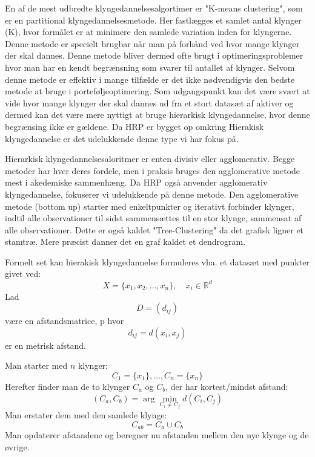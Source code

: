 \documentclass[../main.tex]{subfiles}
\begin{document}
En af de mest udbredte klyngedannelsesalgortimer er "K-means clustering", som er en partitional klyngedannelsesmetode. Her fastlægges et samlet antal klynger (K), hvor formålet er at minimere den samlede variation inden for klyngerne. Denne metode er specielt brugbar når man på forhånd ved hvor mange klynger der skal dannes. Denne metode bliver dermed ofte brugt i optimeringsproblemer hvor man har en kendt begrænsning som svarer til antallet af klynger. Selvom denne metode er effektiv i mange tilfælde er det ikke nødvendigvis den bedste metode at bruge i porteføljeoptimering. Som udgangspunkt kan det være svært at vide hvor mange klynger der skal dannes ud fra et stort datasæt af aktiver og dermed kan det være mere nyttigt at bruge hierarkisk klyngedannelse, hvor denne begrænsing ikke er gældene. Da HRP er bygget op omkring Hierakisk klyngedannelse er det udelukkende denne type vi har fokus på.

Hierarkisk klyngedannelsesaloritmer er enten divisiv eller agglomerativ. Begge metoder har hver deres fordele, men i praksis bruges den agglomerative metode mest i akedemiske sammenhæng. Da HRP også anvender agglomerativ klyngedannelse, fokuserer vi udelukkende på denne metode. Den agglomerative metode (bottom up) starter med enkeltpunkter og iterativt forbinder klynger, indtil alle observationer til sidst sammensættes til en stor klynge, sammensat af alle observationer. Dette er også kaldet "Tree-Clustering" da det grafisk ligner et stamtræ. Mere præcist danner det en graf kaldet et dendrogram.

Formelt set kan hierakisk klyngedannelse formuleres vha. et datasæt med punkter
givet ved:
\begin{equation}
X = \{x_1, x_2, \dots, x_n\}, \quad x_i \in \mathbb{R}^d
\end{equation}
Lad
\begin{equation}
D = (d_{ij})
\end{equation}
være en afstandsmatrice, p hvor
\begin{equation}
d_{ij} = d(x_i, x_j)
\end{equation}
er en metrisk afstand.

Man starter med $n$ klynger:
\begin{equation}
C_1 = \{x_1\}, \dots, C_n = \{x_n\}
\end{equation}
Herefter finder man de to klynger $C_a$ og $C_b$, der har kortest/mindst afstand:
\begin{equation}
(C_a, C_b) = \arg\min_{C_i \neq C_j} d(C_i, C_j)
\end{equation}
Man erstater dem med den samlede klynge:
\begin{equation}
C_{ab} = C_a \cup C_b
\end{equation}
Man opdaterer afstandene og beregner nu afstanden mellem den nye klynge og de øvrige.
\end{document}
